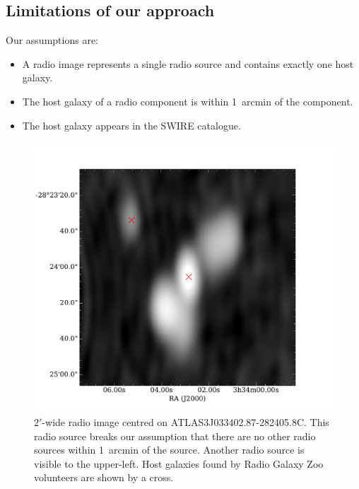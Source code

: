 \documentclass[fleqn,usenatbib,usedcolumn]{mnras}
\begin{document}
  \subsection{Limitations of our approach}
  \label{sec:limitations}

    Our assumptions are:
    \begin{itemize}
      \item A radio image represents a single radio source and contains exactly
        one host galaxy.
      \item The host galaxy of a radio component is within 1~arcmin of the
        component.
      \item The host galaxy appears in the SWIRE catalogue.
    \end{itemize}

    \begin{figure}
      \centering
      \includegraphics[width=\linewidth]{images/ARG0003r2v_radio.pdf}
      \caption{$2'$-wide radio image centred on ATLAS3\textunderscore{}J033402.87-282405.8C.
        This radio source breaks our assumption that there are no other radio
        sources within 1~arcmin of the source. Another radio source is visible
        to the upper-left. Host galaxies found by Radio Galaxy Zoo volunteers
        are shown by a cross.}
      \label{fig:broken-isolation}
    \end{figure}
\end{document}

